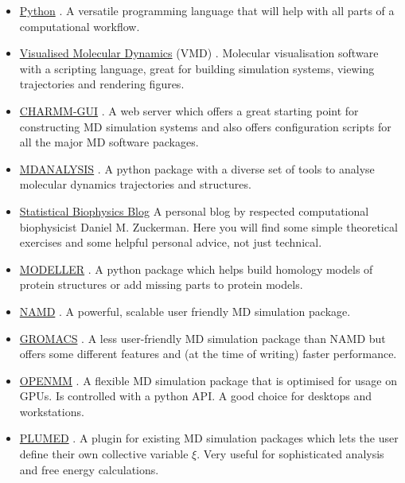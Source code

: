 \begin{itemize}
	\item \href{https://www.python.org/about/gettingstarted/}{Python} \cite{van1995python}. A versatile programming language that will help with all parts of a computational workflow.
	\item \href{https://www.ks.uiuc.edu/Research/vmd/}{Visualised Molecular Dynamics} (VMD) \cite{humphrey1996}. Molecular visualisation software with a scripting language, great for building simulation systems, viewing trajectories and rendering figures. 
	\item \href{https://charmm-gui.org}{CHARMM-GUI} \cite{mallajosyula2015}. A web server which offers a great starting point for constructing MD simulation systems and also offers configuration scripts for all the major MD software packages.
	\item \href{https://www.mdanalysis.org/}{MDANALYSIS} \cite{michaud-agrawal2011, gowers2016}. A python package with a diverse set of tools to analyse molecular dynamics trajectories and structures. 
	\item \href{http://statisticalbiophysicsblog.org/}{Statistical Biophysics Blog} A personal blog by respected computational biophysicist Daniel M. Zuckerman. Here you will find some simple theoretical exercises and some helpful personal advice, not just technical.
	\item \href{https://salilab.org/modeller/}{MODELLER} \cite{sali1993, shen2006, webb2016}. A python package which helps build homology models of protein structures or add missing parts to protein models.
	\item \href{https://www.ks.uiuc.edu/Research/namd/}{NAMD} \cite{phillips2005}. A powerful, scalable user friendly MD simulation package.
	\item \href{https://manual.gromacs.org/current/index.html}{GROMACS} \cite{abraham2015}. A less user-friendly MD simulation package than NAMD but offers some different features and (at the time of writing) faster performance.
	\item \href{https://openmm.org/}{OPENMM} \cite{eastman2017}. A flexible MD simulation package that is optimised for usage on GPUs. Is controlled with a python API. A good choice for desktops and workstations.
	\item \href{https://www.plumed.org/}{PLUMED} \cite{tribello2014}. A plugin for existing MD simulation packages which lets the user define their own collective variable $\xi$. Very useful for sophisticated analysis and free energy calculations. 

\end{itemize}

